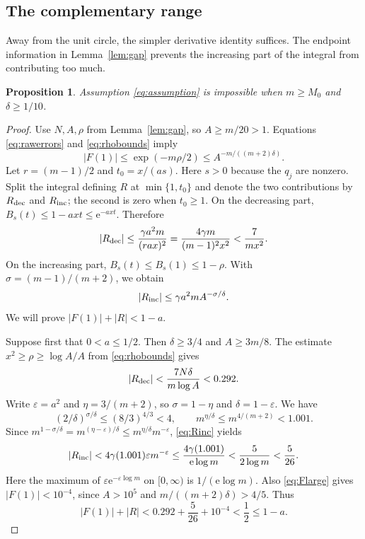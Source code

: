 \documentclass[11pt,letterpaper,reqno]{amsart}
\newtheorem{prop}[thm]{Proposition}
\theoremstyle{definition}
\numberwithin{equation}{section}
\newcommand{\e}{\mathrm e}
\begin{document}
\subsection{The complementary range}
Away from the unit circle, the simpler derivative identity suffices. The endpoint information in Lemma~\ref{lem:gap} prevents the increasing part of the integral from contributing too much.

\begin{prop}\label{prop:away}
Assumption \eqref{eq:assumption} is impossible when $m\ge M_0$ and $\delta\ge1/10$.
\end{prop}

\begin{proof}
Use $N,A,\rho$ from Lemma~\ref{lem:gap}, so $A\ge m/20>1$. Equations \eqref{eq:rawerrors} and \eqref{eq:rhobounds} imply
\begin{equation}\label{eq:Flarge}
 |F(1)|\le\exp(-m\rho/2)
       \le A^{-m/((m+2)\delta)}.
\end{equation}
Let $r=(m-1)/2$ and $t_0=x/(as)$. Here $s>0$ because the $q_j$ are nonzero. Split the integral defining $R$ at $\min\{1,t_0\}$ and denote the two contributions by $R_{\rm dec}$ and $R_{\rm inc}$; the second is zero when $t_0\ge1$.
On the decreasing part, $B_s(t)\le1-axt\le\e^{-axt}$. Therefore
\begin{equation}\label{eq:Rdec}
 |R_{\rm dec}|
 \le\frac{\gamma a^2m}{(rax)^2}
 =\frac{4\gamma m}{(m-1)^2x^2}<\frac7{mx^2}.
\end{equation}
On the increasing part, $B_s(t)\le B_s(1)\le1-\rho$. With $\sigma=(m-1)/(m+2)$, we obtain
\begin{equation}\label{eq:Rinc}
 |R_{\rm inc}|\le\gamma a^2m A^{-\sigma/\delta}.
\end{equation}
We will prove $|F(1)|+|R|<1-a$.

Suppose first that $0<a\le1/2$. Then $\delta\ge3/4$ and $A\ge3m/8$. The estimate $x^2\ge\rho\ge\log A/A$ from \eqref{eq:rhobounds} gives
\[
 |R_{\rm dec}|<\frac{7N\delta}{m\log A}<0.292.
\]
Write $\varepsilon=a^2$ and $\eta=3/(m+2)$, so $\sigma=1-\eta$ and $\delta=1-\varepsilon$. We have
\[
 (2/\delta)^{\sigma/\delta}\le(8/3)^{4/3}<4,
 \qquad m^{\eta/\delta}\le m^{4/(m+2)}<1.001.
\]
Since $m^{1-\sigma/\delta}=m^{(\eta-\varepsilon)/\delta}
\le m^{\eta/\delta}m^{-\varepsilon}$, \eqref{eq:Rinc} yields
\[
 |R_{\rm inc}|<4\gamma(1.001)\varepsilon m^{-\varepsilon}
 \le\frac{4\gamma(1.001)}{\e\log m}
 <\frac5{2\log m}<\frac5{26}.
\]
Here the maximum of $\varepsilon\e^{-\varepsilon\log m}$ on $[0,\infty)$ is $1/(\e\log m)$. Also \eqref{eq:Flarge} gives $|F(1)|<10^{-4}$, since $A>10^5$ and $m/((m+2)\delta)>4/5$. Thus
\[
 |F(1)|+|R|<0.292+\frac5{26}+10^{-4}<\frac12\le1-a.
\]


\end{proof}
\end{document}
